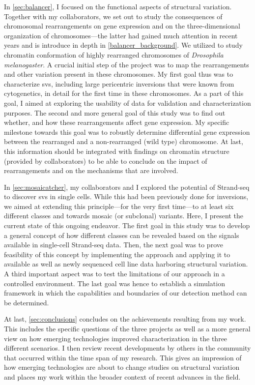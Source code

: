 In \cref{sec:balancer}, I focused on the functional aspects of structural variation.
Together with my collaborators, we set out to study the consequences of
chromosomal rearrangements on gene expression and on the three-dimensional
organization of chromosomes---the latter had gained much attention in recent
years and is introduce in depth in \cref{balancer_background}. We utilized \hic
to study chromatin conformation of highly rearranged chromosomes of
\textit{Drosophila melanogaster}. A crucial initial step of the project was to
map the rearrangements and other variation present in these chromosomes. My
first goal thus was to characterize \acp{sv}, including large pericentric
inversions that were known from cytogenetics, in detail for the first time in
these chromosomes. As a part of this goal, I aimed at exploring the usability of
\hic data for validation and characterization purposes. The second and more
general goal of this study was to find out whether, and how these rearrangements
affect gene expression. My specific milestone towards this goal was to robustly
determine differential gene expression between the rearranged and a
non-rearranged (wild type) chromosome. At last, this information should be
integrated with findings on chromatin structure (provided by collaborators) to
be able to conclude on the impact of rearrangements and on the mechanisms that
are involved.

In \cref{sec:mosaicatcher}, my collaborators and I explored the potential of
Strand-seq to discover \acp{sv} in single cells. While this had been previously
done for inversions, we aimed at extending this principle---for the very first
time---to at least six different \sv classes and towards mosaic (or subclonal)
variants.  Here, I present the current state of this ongoing endeavor. The first
goal in this study was to develop a general concept of how different \sv classes
can be revealed based on the signals available in single-cell Strand-seq data.
Then, the next goal was to prove feasibility of this concept by implementing the
approach and applying it to available as well as newly sequenced cell line data
harboring structural variation. A third important aspect was to test the
limitations of our approach in a controlled environment. The last goal was hence
to establish a simulation framework in which the capabilities and boundaries of
our \sv detection method can be determined.

At last, \cref{sec:conclusions} concludes on the achievements resulting from my
work. This includes the specific questions of the three projects as well as a
more general view on how emerging technologies improved \sv characterization in
the three different scenarios. I then review recent developments by others in
the community that occurred within the time span of my research. This gives an
impression of how emerging technologies are about to change studies on
structural variation and places my work within the broader context of recent
advances in the field.

